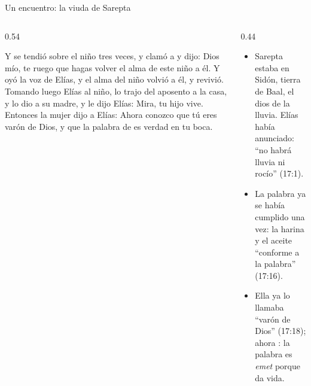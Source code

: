 \begin{frame}{Un encuentro: la viuda de Sarepta}
\begin{columns}[t,onlytextwidth]
\begin{column}{0.54\textwidth}
\begin{cita}Y se tendió sobre el niño tres veces, y clamó a \SENOR{} y dijo: \SENOR{} Dios mío, te ruego que hagas volver el alma de este niño a él. Y \SENOR{} oyó la voz de Elías, y el alma del niño volvió a él, y revivió. Tomando luego Elías al niño, lo trajo del aposento a la casa, y lo dio a su madre, y le dijo Elías: Mira, tu hijo vive. Entonces la mujer dijo a Elías: Ahora conozco que tú eres varón de Dios, y que la palabra de \SENOR{} es verdad en tu boca.\end{cita}
\begin{center}\end{center}
\end{column}
\begin{column}{0.44\textwidth}\small
\begin{itemize}
\item Sarepta estaba en Sidón, tierra de Baal, el dios de la lluvia. Elías había anunciado: ``no habrá lluvia ni rocío'' (17:1).
\item La palabra ya se había cumplido una vez: la harina y el aceite ``conforme a la palabra'' (17:16).
\item Ella ya lo llamaba ``varón de Dios'' (17:18); ahora : la palabra es \emph{emet} porque da vida.
\end{itemize}
\end{column}
\end{columns}
\end{frame}

